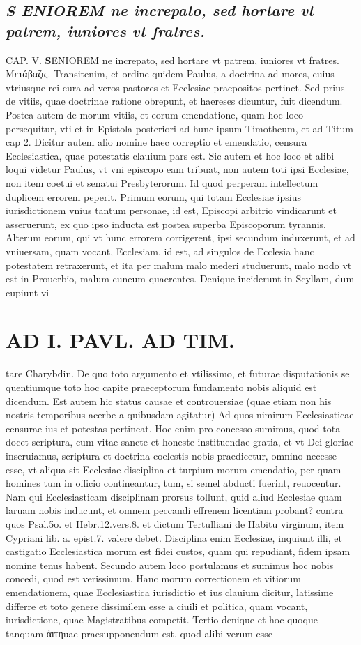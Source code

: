 \documentclass{article}
\begin{document}
\begin{pages}
\subsection*{\textit{S ENIOREM ne increpato, sed hortare vt patrem, iuniores vt fratres.}}CAP. V. 
\textbf{S}ENIOREM ne increpato, sed hortare vt patrem, iuniores vt fratres. Μετάβαζις. Transitenim, et ordine quidem Paulus, a doctrina ad mores, cuius vtriusque rei cura ad veros pastores et Ecclesiae praepositos pertinet. Sed prius de vitiis, quae doctrinae ratione obrepunt, et haereses dicuntur, fuit dicendum. Postea autem de morum vitiis, et eorum emendatione, quam hoc loco persequitur, vti et in Epistola posteriori ad hunc ipsum Timotheum, et ad Titum cap 2. Dicitur autem alio nomine haec correptio et emendatio, censura Ecclesiastica, quae potestatis clauium pars est. Sic autem et hoc loco et alibi loqui videtur Paulus, vt vni episcopo eam tribuat, non autem toti ipsi Ecclesiae, non item coetui et senatui Presbyterorum. Id quod perperam intellectum duplicem errorem peperit. Primum eorum, qui totam Ecclesiae ipsius iurisdictionem vnius tantum personae, id est, Episcopi arbitrio vindicarunt et asseruerunt, ex quo ipso inducta est postea superba Episcoporum tyrannis. Alterum eorum, qui vt hunc errorem corrigerent, ipsi secundum induxerunt, et ad vniuersam, quam vocant, Ecclesiam, id est, ad singulos de Ecclesia hanc potestatem retraxerunt, et ita per malum malo mederi studuerunt, malo nodo vt est in Prouerbio, malum cuneum quaerentes. Denique inciderunt in Scyllam, dum cupiunt vi\pend
\section*{AD I. PAVL. AD TIM. }
\marginpar{[ p.240 ]}\pstart tare Charybdin. De quo toto argumento et vtilissimo, et futurae disputationis se quentiumque toto hoc capite praeceptorum fundamento nobis aliquid est dicendum. Est autem hic status causae et controuersiae (quae etiam non his nostris temporibus acerbe a quibusdam agitatur) Ad quos nimirum Ecclesiasticae censurae ius et potestas pertineat. Hoc enim pro concesso sumimus, quod tota docet scriptura, cum vitae sancte et honeste instituendae gratia, et vt Dei gloriae inseruiamus, scriptura et doctrina coelestis nobis praedicetur, omnino necesse esse, vt aliqua sit Ecclesiae disciplina et turpium morum emendatio, per quam homines tum in officio contineantur, tum, si semel abducti fuerint, reuocentur. Nam qui Ecclesiasticam disciplinam prorsus tollunt, quid aliud Ecclesiae quam laruam nobis inducunt, et omnem peccandi effrenem licentiam probant? contra quos Psal.5o. et Hebr.12.vers.8. et dictum Tertulliani de Habitu virginum, item Cypriani lib.  a. epist.7. valere debet. Disciplina enim Ecclesiae, inquiunt illi, et castigatio Ecclesiastica morum est fidei custos, quam qui repudiant, fidem ipsam nomine tenus habent. Secundo autem loco postulamus et sumimus hoc nobis concedi, quod est verissimum. Hanc morum correctionem et vitiorum emendationem, quae Ecclesiastica iurisdictio et ius clauium dicitur, latissime differre et toto genere dissimilem esse a ciuili et politica, quam vocant, iurisdictione, quae Magistratibus competit. Tertio denique et hoc quoque tanquam ἀιτηuae praesupponendum est, quod alibi verum esse  \pend

\end{pages}
\end{document}
